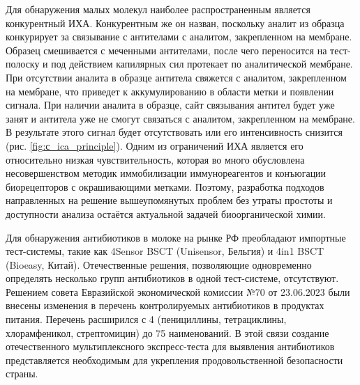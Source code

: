 Для обнаружения малых молекул наиболее распространенным является конкурентный ИХА. Конкурентным же он назван, поскольку аналит из образца конкурирует за связывание с антителами с аналитом, закрепленном на мембране. Образец смешивается с меченными антителами, после чего переносится на тест-полоску и под действием капилярных сил протекает по аналитической мембране. При отсутствии аналита в образце антитела свяжется с аналитом, закрепленном на мембране, что приведет к аккумулированию в области метки и появлении сигнала. При наличии аналита в образце, сайт связывания антител будет уже занят и антитела уже не смогут связаться с аналитом, закрепленном на мембране. В результате этого сигнал будет отсутствовать или его интенсивность снизится (рис. \cref{fig:с_ica_principle}).  Одним из ограничений ИХА является его относительно низкая чувствительность, которая во много обусловлена несовершенством методик иммобилизации иммунореагентов и конъюгации биорецепторов с окрашивающими метками. Поэтому, разработка подходов направленных на решение вышеупомянутых проблем без утраты простоты и доступности анализа остаётся актуальной задачей биоорганической химии.

Для обнаружения антибиотиков в молоке на рынке РФ преобладают импортные тест-системы, такие как 4Sensor BSCT (Unisensor, Бельгия) и 4in1 BSCT (Bioeasy, Китай). Отечественные решения, позволяющие одновременно определять несколько групп антибиотиков в одной тест-системе, отсутствуют. Решением совета Евразийской экономической комиссии №70 от 23.06.2023 были внесены изменения в перечень контролируемых антибиотиков в продуктах питания. Перечень расширился с 4 (пенициллины, тетрациклины, хлорамфеникол, стрептомицин) до 75 наименований. В этой связи создание отечественного мультиплексного экспресс-теста для выявления антибиотиков представляется необходимым для укрепления продовольственной безопасности страны.

\progress


